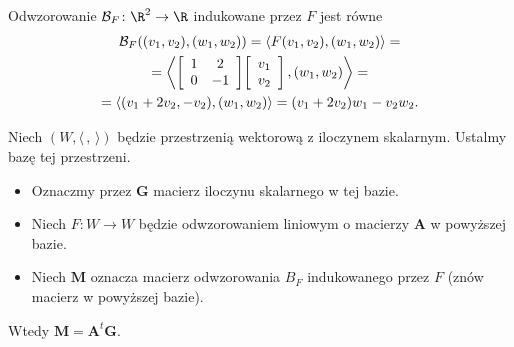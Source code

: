 \begin{frame}

\pause \begin{przyklad}
Odwzorowanie $\mathcal{B}_{F}\colon \R^{2} \to \R$ indukowane przez $F$ jest r\'owne
\begin{multline*}
\mathcal{B}_{F}(( v_1 , v_2 ), (w_1 , w_2 ))=\langle F(v_1,v_2),(w_1,w_2)\rangle =\\ 
=\left\langle\left[\begin{array}{ c c }
1 & 2\\
0 & -1
\end{array}\right]\!
\left[\begin{array}{c}
v_1 \\
v_2
\end{array}
\right],(w_1,w_2) \right\rangle =\\= \langle (v_1 + 2v_2 , -v_2 ) , ( w_1 , w_2 )\rangle=(v_1 +2 v_2)w_1 - v_2 w_2.
\end{multline*}

\end{przyklad}

\end{frame}
\begin{frame}

\begin{lemat}
Niech $(W,\langle\,,\,\rangle)$ będzie przestrzenią wektorową z iloczynem skalarnym. Ustalmy bazę tej przestrzeni.
\begin{itemize}
\pause \item Oznaczmy przez $\mathbf{G}$ macierz iloczynu skalarnego w tej bazie.
\pause \item Niech $F\colon W\to W$ będzie odwzorowaniem liniowym o macierzy $\mathbf{A}$ w powyższej bazie.
\pause \item Niech $\mathbf{M}$ oznacza macierz odwzorowania $B_F$ indukowanego przez $F$ (znów macierz w powyższej bazie).
\end{itemize}
\pause Wtedy $\mathbf{M}=\mathbf{A}^t \mathbf{G}$.

\end{lemat}
\end{frame}

